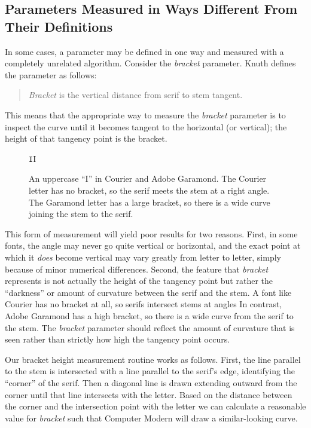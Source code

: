 \documentclass[12pt]{article}
\begin{document}
\subsection{Parameters Measured in Ways Different From Their Definitions}

In some cases, a parameter may be defined in one way and measured with a
completely unrelated algorithm. Consider the \emph{bracket} parameter. Knuth
defines the parameter as follows:
\begin{quote}
\emph{Bracket} is the vertical distance from serif to stem tangent.
\end{quote}
This means that the appropriate way to measure the \emph{bracket} parameter is
to inspect the curve until it becomes tangent to the horizontal (or vertical);
the height of that tangency point is the bracket.

\begin{figure}
\centering
\Huge
\texttt{I}\quad I
\caption{An uppercase ``I'' in Courier and Adobe Garamond. The Courier letter
has no bracket, so the serif meets the stem at a right angle. The Garamond
letter has a large bracket, so there is a wide curve joining the stem to the
serif.}
\end{figure}

This form of measurement will yield poor results for two reasons. First, in some
fonts, the angle may never go quite vertical or horizontal, and the exact point
at which it \emph{does} become vertical may vary greatly from letter to letter,
simply because of minor numerical differences. Second, the feature that
\emph{bracket} represents is not actually the height of the tangency point but
rather the ``darkness'' or amount of curvature between the serif and the stem. A
font like Courier has no bracket at all, so serifs intersect stems at angles In
contrast, Adobe Garamond has a high bracket, so there is a wide curve from the
serif to the stem. The \emph{bracket} parameter should reflect the amount of
curvature that is seen rather than strictly how high the tangency point occurs.

Our bracket height measurement routine works as follows. First, the line
parallel to the stem is intersected with a line parallel to the serif's edge,
identifying the ``corner'' of the serif. Then a diagonal line is drawn extending
outward from the corner until that line intersects with the letter. Based on the
distance between the corner and the intersection point with the letter we can
calculate a reasonable value for \emph{bracket} such that Computer Modern will
draw a similar-looking curve.
\end{document}
